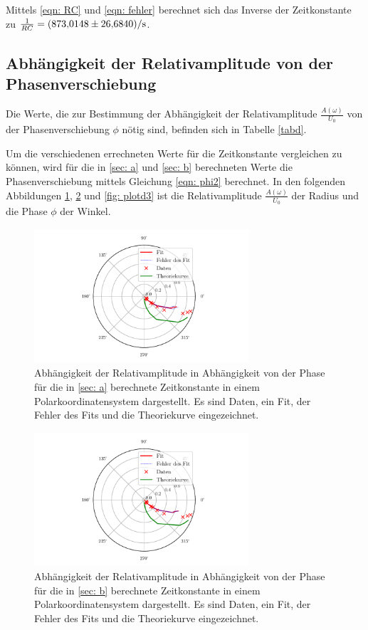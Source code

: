 Mittels \eqref{eqn: RC} und \eqref{eqn: fehler} berechnet sich das Inverse der Zeitkonstante zu
$\frac{1}{RC} = \SI{873.0148  \pm 26.684}{\per\second}$.

\subsection{Abhängigkeit der Relativamplitude von der Phasenverschiebung}
Die Werte, die zur Bestimmung der Abhängigkeit der Relativamplitude $\frac{A(\omega)}{U_{0}}$ von der
Phasenverschiebung $\phi$ nötig sind, befinden sich in Tabelle \ref{tabd}.

Um die verschiedenen errechneten Werte für die Zeitkonstante vergleichen
zu können, wird für die in \ref{sec: a} und \ref{sec: b} berechneten Werte die Phasenverschiebung mittels
Gleichung \eqref{eqn: phi2} berechnet. In den folgenden Abbildungen \ref{fig: plotd1}, \ref{fig: plotd2} und
\ref{fig: plotd3} ist die Relativamplitude $\frac{A(\omega)}{U_{0}}$ der Radius und die Phase $\phi$ der Winkel.
\begin{figure}
  \centering
  \includegraphics[width=8cm, height=5cm]{build/plotd1.pdf}
  \caption{Abhängigkeit der Relativamplitude in Abhängigkeit von der Phase für die in \ref{sec: a} 
  berechnete Zeitkonstante in einem Polarkoordinatensystem dargestellt. Es sind Daten, ein Fit, der Fehler
  des Fits und die Theoriekurve eingezeichnet.}
  \label{fig: plotd1}
\end{figure}

\begin{figure}
  \centering
  \includegraphics[width=8cm, height=5cm]{build/plotd2.pdf}
  \caption{Abhängigkeit der Relativamplitude in Abhängigkeit von der Phase für die in \ref{sec: b} 
  berechnete Zeitkonstante in einem Polarkoordinatensystem dargestellt. Es sind Daten, ein Fit, der Fehler
  des Fits und die Theoriekurve eingezeichnet.}
  \label{fig: plotd2}
\end{figure}

